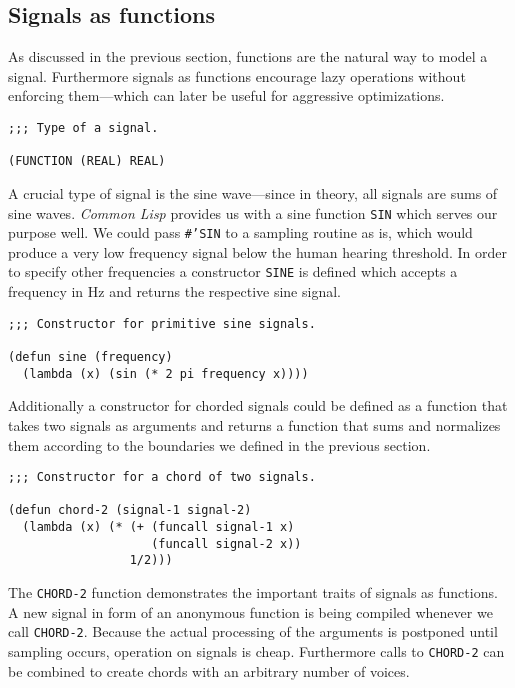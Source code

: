 \subsection{Signals as functions}

As discussed in the previous section, functions are the natural way
to model a signal. Furthermore signals as functions encourage lazy
operations without enforcing them---which can later be useful for
aggressive optimizations.

\begin{verbatim}
;;; Type of a signal.

(FUNCTION (REAL) REAL)
\end{verbatim}

A crucial type of signal is the sine wave---since in theory, all
signals are sums of sine waves. \textit{Common Lisp} provides us with a
sine function \texttt{SIN} which serves our purpose well. We could pass
\texttt{\#'SIN} to a sampling routine as is, which would produce a very
low frequency signal below the human hearing threshold. In order to
specify other frequencies a constructor \texttt{SINE} is defined which
accepts a frequency in Hz and returns the respective sine signal.

\begin{verbatim}
;;; Constructor for primitive sine signals.

(defun sine (frequency)
  (lambda (x) (sin (* 2 pi frequency x))))
\end{verbatim}

Additionally a constructor for chorded signals could be defined as a
function that takes two signals as arguments and returns a function that
sums and normalizes them according to the boundaries we defined in the
previous section.

\begin{verbatim}
;;; Constructor for a chord of two signals.

(defun chord-2 (signal-1 signal-2)
  (lambda (x) (* (+ (funcall signal-1 x)
                    (funcall signal-2 x))
                 1/2)))
\end{verbatim}

The \texttt{CHORD-2} function demonstrates the important traits of
signals as functions. A new signal in form of an anonymous function is
being compiled whenever we call \texttt{CHORD-2}. Because the actual
processing of the arguments is postponed until sampling occurs,
operation on signals is cheap. Furthermore calls to \texttt{CHORD-2}
can be combined to create chords with an arbitrary number of voices.
